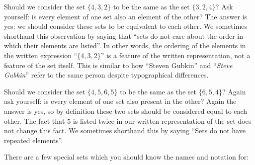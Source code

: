 Should we consider the set $\{4,3,2\}$ to be the same as the set $\{3,2,4\}$?  Ask yourself:  is every element of one set also an element of the other?  The answer is yes:  we should consider these sets to be equivalent to each other.  We sometimes shorthand this observation by saying that ``sets do not care about the order in which their elements are listed''.  In other words, the ordering of the elements in the written expression ``$\{4,3,2\}$'' is a feature of the written representation, not a feature of the set itself.  This is similar to how  ``Steven Gubkin'' and ``\textit{Steve Gubkin}'' refer to the same person despite typographical differences.

Should we consider the set $\{4,5,6,5\}$ to be the same as the set $\{6,5,4\}$?  Again ask yourself:  is every element of one set also present in the other?  Again the answer is yes, so by definition these two sets should be considered equal to each other.  The fact that $5$ is listed twice in our written representation of the set does not change this fact.  We sometimes shorthand this by saying ``Sets do not have repeated elements''.

There are a few special sets which you should know the names and notation for:

